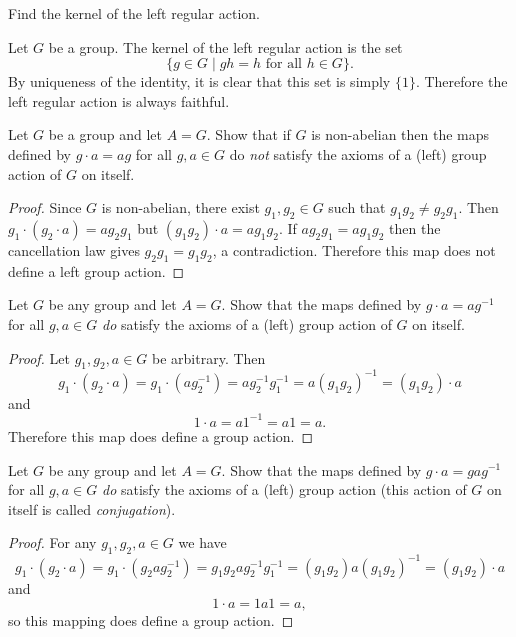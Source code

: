  Find the kernel of the left regular action.
\begin{solution}
  Let $G$ be a group. The kernel of the left regular action is the set
  \begin{equation*}
    \{g\in G\mid \text{$gh = h$ for all $h\in G$}\}.
  \end{equation*}
  By uniqueness of the identity, it is clear that this set is simply
  $\{1\}$. Therefore the left regular action is always faithful.
\end{solution}

 Let $G$ be a group and let $A = G$. Show that if $G$ is
non-abelian then the maps defined by $g\cdot a = ag$ for all
$g,a\in G$ do {\em not} satisfy the axioms of a (left) group action of
$G$ on itself.
\begin{proof}
  Since $G$ is non-abelian, there exist $g_1,g_2\in G$ such that
  $g_1g_2 \neq g_2g_1$. Then $g_1\cdot(g_2\cdot a) = ag_2g_1$ but
  $(g_1g_2)\cdot a = ag_1g_2$. If $ag_2g_1 = ag_1g_2$ then the
  cancellation law gives $g_2g_1 = g_1g_2$, a contradiction. Therefore
  this map does not define a left group action.
\end{proof}

 Let $G$ be any group and let $A = G$. Show that the maps
defined by $g\cdot a = ag^{-1}$ for all $g,a\in G$ {\em do} satisfy
the axioms of a (left) group action of $G$ on itself.
\begin{proof}
  Let $g_1,g_2,a\in G$ be arbitrary. Then
  \begin{equation*}
    g_1\cdot(g_2\cdot a) = g_1\cdot(ag_2^{-1})
    = ag_2^{-1}g_1^{-1} = a(g_1g_2)^{-1} = (g_1g_2)\cdot a
  \end{equation*}
  and
  \begin{equation*}
    1\cdot a = a1^{-1} = a1 = a.
  \end{equation*}
  Therefore this map does define a group action.
\end{proof}

 Let $G$ be any group and let $A = G$. Show that the maps
defined by $g\cdot a = gag^{-1}$ for all $g,a\in G$ {\em do} satisfy
the axioms of a (left) group action (this action of $G$ on itself is
called {\em conjugation}).
\begin{proof}
  For any $g_1,g_2,a\in G$ we have
  \begin{equation*}
    g_1\cdot(g_2\cdot a) = g_1\cdot(g_2ag_2^{-1})
    = g_1g_2ag_2^{-1}g_1^{-1} = (g_1g_2)a(g_1g_2)^{-1}
    = (g_1g_2)\cdot a
  \end{equation*}
  and
  \begin{equation*}
    1\cdot a = 1a1 = a,
  \end{equation*}
  so this mapping does define a group action.
\end{proof}
